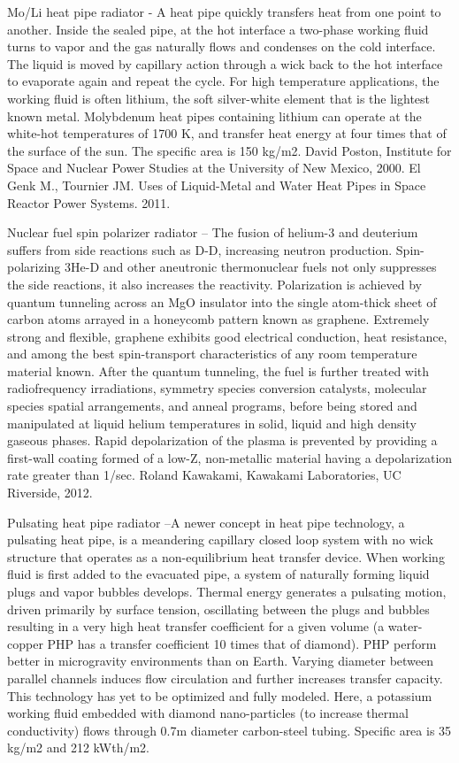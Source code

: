 \documentclass[a4paper]{book}
\begin{document}
Mo/Li heat pipe radiator - A heat pipe quickly transfers heat from one point to another. Inside the sealed pipe, at the hot interface a two-phase working fluid turns to vapor and the gas naturally flows and condenses on the cold interface. The liquid is moved by capillary action through a wick back to the hot interface to evaporate again and repeat the cycle. For high temperature applications, the working fluid is often lithium, the soft silver-white element that is the lightest known metal. Molybdenum heat pipes containing lithium can operate at the white-hot temperatures of 1700 K, and transfer heat energy at four times that of the surface of the sun. The specific area is 150 kg/m2. David Poston, Institute for Space and Nuclear Power Studies at the University of New Mexico, 2000. El Genk M., Tournier JM. Uses of Liquid-Metal and Water Heat Pipes in Space Reactor Power Systems. 2011.
 
Nuclear fuel spin polarizer radiator – The fusion of helium-3 and deuterium suffers from side reactions such as D-D, increasing neutron production. Spin-polarizing 3He-D and other aneutronic thermonuclear fuels not only suppresses the side reactions, it also increases the reactivity. Polarization is achieved by quantum tunneling across an MgO insulator into the single atom-thick sheet of carbon atoms arrayed in a honeycomb pattern known as graphene. Extremely strong and flexible, graphene exhibits good electrical conduction, heat resistance, and among the best spin-transport characteristics of any room temperature material known. After the quantum tunneling, the fuel is further treated with radiofrequency irradiations, symmetry species conversion catalysts, molecular species spatial arrangements, and anneal programs, before being stored and manipulated at liquid helium temperatures in solid, liquid and high density gaseous phases. Rapid depolarization of the plasma is prevented by providing a first-wall coating formed of a low-Z, non-metallic material having a depolarization rate greater than 1/sec. Roland Kawakami, Kawakami Laboratories, UC Riverside, 2012.
 
Pulsating heat pipe radiator –A newer concept in heat pipe technology, a pulsating heat pipe, is a meandering capillary closed loop system with no wick structure that operates as a non-equilibrium heat transfer device.  When working fluid is first added to the evacuated pipe, a system of naturally forming liquid plugs and vapor bubbles develops.  Thermal energy generates a pulsating motion, driven primarily by surface tension, oscillating between the plugs and bubbles resulting in a very high heat transfer coefficient for a given volume (a water-copper PHP has a transfer coefficient 10 times that of diamond).  PHP perform better in microgravity environments than on Earth. Varying diameter between parallel channels induces flow circulation and further increases transfer capacity. This technology has yet to be optimized and fully modeled. Here, a potassium working fluid embedded with diamond nano-particles (to increase thermal conductivity) flows through 0.7m diameter carbon-steel tubing.  Specific area is 35 kg/m2 and 212 kWth/m2.
 
\end{document}
